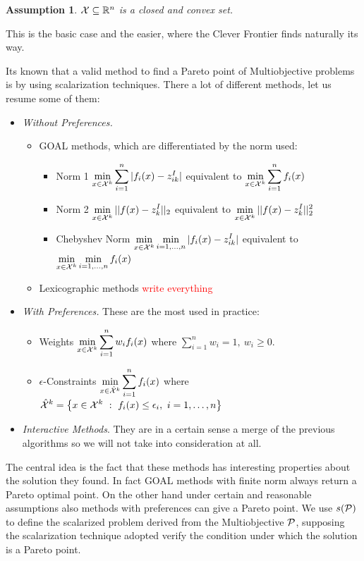 \documentclass{article}
\newcommand{\red}[1]{\textcolor{red}{#1}}
\newtheorem{assumption}[theorem]{Assumption}
\def\setRn{\mathbb{R}^n}
\def\ds{\displaystyle}
\def\X{{\cal X}}
\begin{document}
	\begin{assumption}
		$\X \subseteq \setRn$ is a closed and convex set.
	\end{assumption}
	
	This is the basic case and the easier, where the Clever Frontier finds naturally its way.
	
	Its known that a valid method to find a Pareto point of Multiobjective problems is by using scalarization techniques. There a lot of different methods, let us resume some of them:
	\begin{itemize}
		\item {\it Without Preferences.} 
		\begin{itemize} \item{ GOAL} methods, which are differentiated by the norm used:
		\begin{itemize}
			\item Norm 1 $\ds \min_{x \in \X^k} \sum_{i=1}^{n} |f_i(x) - z_{i k}^{I}| $ equivalent to $\ds \min_{x \in \X^k} \sum_{i=1}^{n}  f_i(x)$
			\item Norm 2 $\ds \min_{x \in \X^k}  || f(x) - z_{ k}^{I}||_2 $ equivalent to $\ds \min_{x \in \X^k}  || f(x) - z_{k}^{I}||_2^2$
			\item Chebyshev Norm $\ds \min_{x \in \X^k} \min_{i=1,\dots, n} | f_i(x) - z_{i k}^{I}| $ equivalent to $\ds \min_{x \in \X^k} \min_{i=1,\dots, n} f_i(x) $ 
		\end{itemize}
		\item { Lexicographic} methods \red{write everything}
		\end{itemize}
		\item {\it With Preferences.} These are the most used in practice:
		\begin{itemize}
			\item Weights $\ds \min_{x \in \X^k} \sum_{i=1}^{n} w_i f_i(x)$ where $\ds \sum_{i=1}^n w_i = 1,\ w_i\ge 0.$
			\item $\epsilon$-Constraints $\ds \min_{x \in \hat{\X}^k} \sum_{i=1}^{n}  f_i(x)  $ where $\ds \hat{\X}^k = \left\{x \in \X^k \ :\ f_i(x) \le \epsilon_i, \ i = 1, \dots, n  \right\}$
		\end{itemize}
		\item {\it Interactive Methods}. They are in a certain sense a merge of the previous algorithms so we will not take into consideration at all.
	\end{itemize}
	
	
	The central idea is the fact that these methods has interesting properties about the solution they found.
	In fact GOAL methods with finite norm always return a Pareto optimal point. On the other hand under certain and reasonable assumptions also methods with preferences can give a Pareto point.
	We use 	$ s({\cal P}) $ to define the scalarized problem derived from the Multiobjective $\cal P$, supposing the scalarization technique adopted verify the condition under which the solution is a Pareto point.
	
\end{document}
